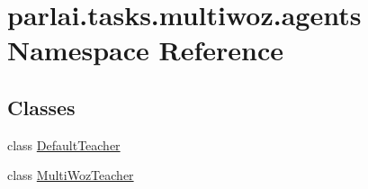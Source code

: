 \hypertarget{namespaceparlai_1_1tasks_1_1multiwoz_1_1agents}{}\section{parlai.\+tasks.\+multiwoz.\+agents Namespace Reference}
\label{namespaceparlai_1_1tasks_1_1multiwoz_1_1agents}
\subsection*{Classes}
\begin{DoxyCompactItemize}
\item 
class \hyperlink{classparlai_1_1tasks_1_1multiwoz_1_1agents_1_1DefaultTeacher}{Default\+Teacher}
\item 
class \hyperlink{classparlai_1_1tasks_1_1multiwoz_1_1agents_1_1MultiWozTeacher}{Multi\+Woz\+Teacher}
\end{DoxyCompactItemize}
